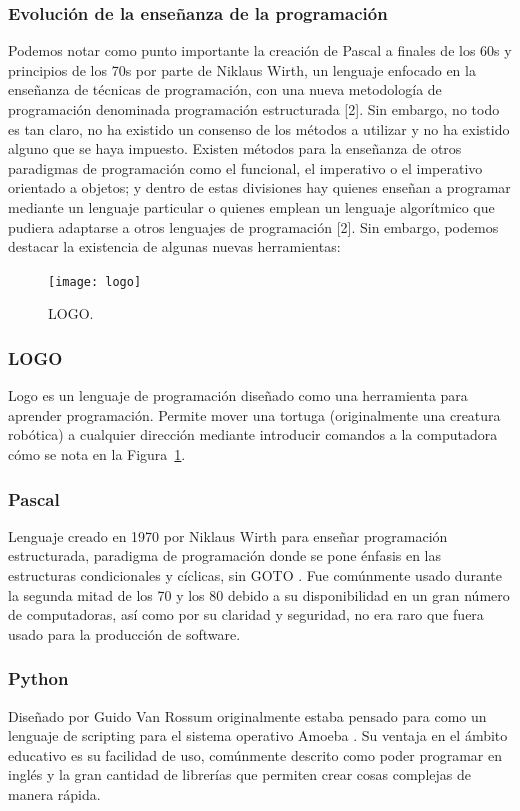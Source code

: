 \subsubsection{Evolución de la enseñanza de la programación}
Podemos notar como punto importante la creación de Pascal a finales de los 60s y principios de los 70s por parte de Niklaus Wirth, un lenguaje enfocado en la enseñanza de técnicas de programación, con una nueva metodología de programación denominada programación estructurada [2]. Sin embargo, no todo es tan claro, no ha existido un consenso de los métodos a utilizar y no ha existido alguno que se haya impuesto. 
Existen métodos para la enseñanza de otros paradigmas de programación como el funcional, el imperativo o el imperativo orientado a objetos; y dentro de estas divisiones hay quienes enseñan a programar mediante un lenguaje particular o quienes emplean un lenguaje algorítmico que pudiera adaptarse a otros lenguajes de programación [2].
Sin embargo, podemos destacar la existencia de algunas nuevas herramientas:

\begin{figure}[ht]
    \centering
    \texttt{[image: logo]}
     \caption{LOGO.}
    \label{fig:logo_scrn}
\end{figure}

\subsubsection{LOGO}
Logo es un lenguaje de programación diseñado como una herramienta para aprender programación. 
Permite mover una tortuga (originalmente una creatura robótica) a cualquier dirección 
mediante introducir comandos a la computadora \cite{logo_history} cómo se nota en la Figura~\ref{fig:logo_scrn}.

\subsubsection{Pascal}
Lenguaje creado en 1970 por Niklaus Wirth para enseñar programación estructurada, 
paradigma de programación donde se pone énfasis en las 
estructuras condicionales y cíclicas, sin GOTO \cite{pascal_history}. 
Fue comúnmente usado durante la segunda mitad de los 70 y los 80 
debido a su disponibilidad en un gran número de computadoras, 
así como por su claridad y seguridad, no era raro que fuera usado para la 
producción de software.

\subsubsection{Python}
Diseñado por Guido Van Rossum originalmente estaba pensado 
para como un lenguaje de scripting para el sistema operativo Amoeba \cite{python_history}. 
Su ventaja en el ámbito educativo es su facilidad de uso, comúnmente descrito 
como poder programar en inglés y la gran cantidad de librerías que permiten 
crear cosas complejas de manera rápida.

